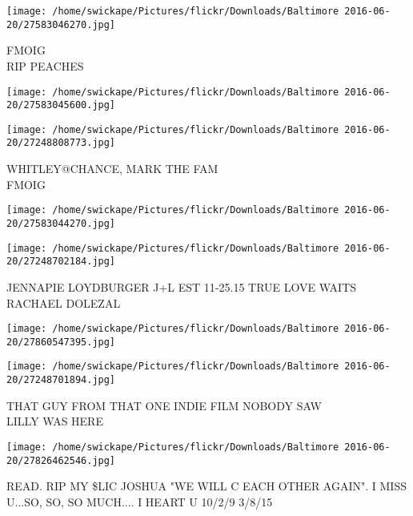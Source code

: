 \documentclass[10pt,letterpaper]{article}
\begin{document}
\vspace{0.25in}
\texttt{[image: /home/swickape/Pictures/flickr/Downloads/Baltimore 2016-06-20/27583046270.jpg]}

FMOIG\\
RIP PEACHES\\
\pagebreak

\texttt{[image: /home/swickape/Pictures/flickr/Downloads/Baltimore 2016-06-20/27583045600.jpg]}

\vspace{0.25in}
\texttt{[image: /home/swickape/Pictures/flickr/Downloads/Baltimore 2016-06-20/27248808773.jpg]}

WHITLEY@CHANCE, MARK THE FAM\\
FMOIG\\
\pagebreak

\texttt{[image: /home/swickape/Pictures/flickr/Downloads/Baltimore 2016-06-20/27583044270.jpg]}

\vspace{0.25in}
\texttt{[image: /home/swickape/Pictures/flickr/Downloads/Baltimore 2016-06-20/27248702184.jpg]}

JENNAPIE LOYDBURGER J+L EST 11{-}25.15 TRUE LOVE WAITS\\
RACHAEL DOLEZAL\\
\pagebreak

\texttt{[image: /home/swickape/Pictures/flickr/Downloads/Baltimore 2016-06-20/27860547395.jpg]}

\vspace{0.25in}
\texttt{[image: /home/swickape/Pictures/flickr/Downloads/Baltimore 2016-06-20/27248701894.jpg]}

THAT GUY FROM THAT ONE INDIE FILM NOBODY SAW\\
LILLY WAS HERE\\
\pagebreak

\texttt{[image: /home/swickape/Pictures/flickr/Downloads/Baltimore 2016-06-20/27826462546.jpg]}

READ.  RIP MY \$LIC JOSHUA "WE WILL C EACH OTHER AGAIN".  I MISS U...SO, SO, SO MUCH.... I HEART U 10/2/9 3/8/15\\
\pagebreak
\end{document}
